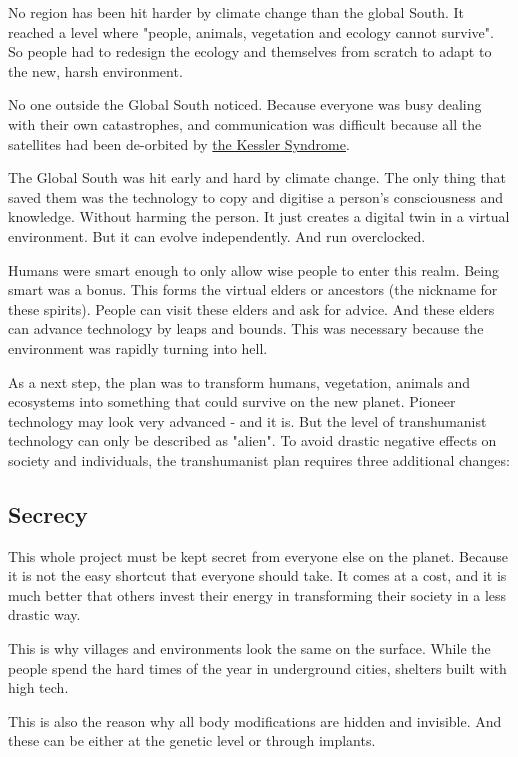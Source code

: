 No region has been hit harder by climate change than the global South. It reached a level where "people, animals, vegetation and ecology cannot survive". So people had to redesign the ecology and themselves from scratch to adapt to the new, harsh environment.

No one outside the Global South noticed. Because everyone was busy dealing with their own catastrophes, and communication was difficult because all the satellites had been de-orbited by \hyperref[sec: Kessler Syndrome]{the Kessler Syndrome}.

The Global South was hit early and hard by climate change. The only thing that saved them was the technology to copy and digitise a person's consciousness and knowledge. Without harming the person. It just creates a digital twin in a virtual environment.
But it can evolve independently. And run overclocked.

Humans were smart enough to only allow wise people to enter this realm. Being smart was a bonus. This forms the virtual elders or ancestors (the nickname for these spirits). People can visit these elders and ask for advice.
And these elders can advance technology by leaps and bounds. This was necessary because the environment was rapidly turning into hell.

As a next step, the plan was to transform humans, vegetation, animals and ecosystems into something that could survive on the new planet. Pioneer technology may look very advanced - and it is. But the level of transhumanist technology can only be described as "alien". To avoid drastic negative effects on society and individuals, the transhumanist plan requires three additional changes:

\subsection{Secrecy}

This whole project must be kept secret from everyone else on the planet. Because it is not the easy shortcut that everyone should take. It comes at a cost, and it is much better that others invest their energy in transforming their society in a less drastic way.

This is why villages and environments look the same on the surface. While the people spend the hard times of the year in underground cities, shelters built with high tech.

This is also the reason why all body modifications are hidden and invisible. And these can be either at the genetic level or through implants.

